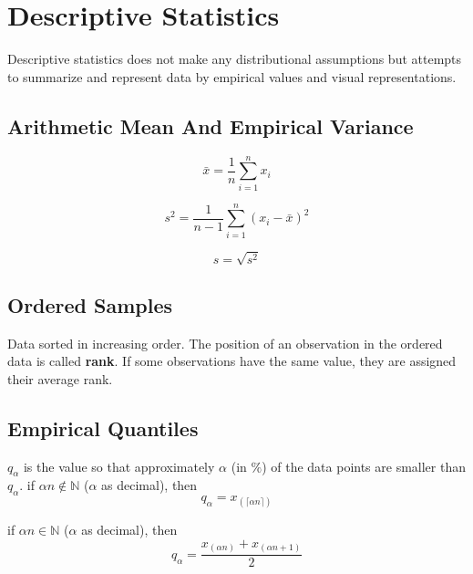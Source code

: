 \section{Descriptive Statistics}
Descriptive statistics does not make any distributional assumptions but attempts to summarize and represent data by empirical values and visual representations.
\subsection{Arithmetic Mean And Empirical Variance}

\begin{equation*}
    \bar{x}=\frac{1}{n}\sum_{i=1}^{n}x_i
\end{equation*}

\newpar{}

\begin{equation*}
    s^2=\frac{1}{n-1}\sum_{i=1}^{n}{(x_i-\bar{x})}^2
\end{equation*}

\newpar{}

\begin{equation*}
    s=\sqrt{s^2}
\end{equation*}

\subsection{Ordered Samples}

Data sorted in increasing order. The position of an observation in the ordered data is called \textbf{rank}. If some observations have the same value, they are assigned their average rank.

\subsection{Empirical Quantiles}
$q_\alpha$ is the value so that approximately $\alpha$ (in $\%$) of the data points are smaller than $q_\alpha$.
\newpar{}
if $\alpha n \notin \mathbb{N}$ ($\alpha$ as decimal), then
\begin{equation*}
    q_\alpha = x_{(\lceil\alpha n\rceil)}
\end{equation*}

if $\alpha n \in \mathbb{N}$ ($\alpha$ as decimal), then
\begin{equation*}
    q_\alpha = \frac{x_{(\alpha n)}+x_{(\alpha n+1)}}{2}
\end{equation*}

